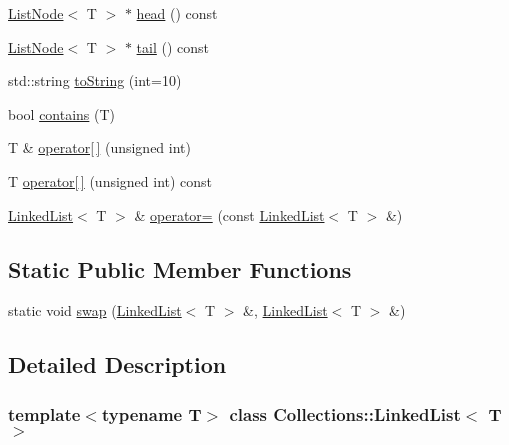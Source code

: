 \begin{DoxyCompactItemize}
\item 
\hyperlink{class_collections_1_1_list_node}{List\+Node}$<$ T $>$ $\ast$ \hyperlink{class_collections_1_1_linked_list_a854255c40752578a69367417f370545c}{head} () const
\item 
\hyperlink{class_collections_1_1_list_node}{List\+Node}$<$ T $>$ $\ast$ \hyperlink{class_collections_1_1_linked_list_abb1529550a311ed2cfd784fc17540b8c}{tail} () const
\item 
std\+::string \hyperlink{class_collections_1_1_linked_list_aa31d67c806b697431151be9264c80ea7}{to\+String} (int=10)
\item 
bool \hyperlink{class_collections_1_1_linked_list_aba10a5308e624f78fe9f356b144e61fa}{contains} (T)
\item 
T \& \hyperlink{class_collections_1_1_linked_list_adb503bc22d6d74144f93bbd59064bba2}{operator\mbox{[}$\,$\mbox{]}} (unsigned int)
\item 
T \hyperlink{class_collections_1_1_linked_list_a6eb74c0ff9720d297ae076b4e218a655}{operator\mbox{[}$\,$\mbox{]}} (unsigned int) const
\item 
\hyperlink{class_collections_1_1_linked_list}{Linked\+List}$<$ T $>$ \& \hyperlink{class_collections_1_1_linked_list_acefe88d73e0db57e3fb7a2529f650eef}{operator=} (const \hyperlink{class_collections_1_1_linked_list}{Linked\+List}$<$ T $>$ \&)
\end{DoxyCompactItemize}
\subsection*{Static Public Member Functions}
\begin{DoxyCompactItemize}
\item 
static void \hyperlink{class_collections_1_1_linked_list_af2bcf49a857d26c8a47aa42dedbc6b2a}{swap} (\hyperlink{class_collections_1_1_linked_list}{Linked\+List}$<$ T $>$ \&, \hyperlink{class_collections_1_1_linked_list}{Linked\+List}$<$ T $>$ \&)
\end{DoxyCompactItemize}


\subsection{Detailed Description}
\subsubsection*{template$<$typename T$>$\newline
class Collections\+::\+Linked\+List$<$ T $>$}

